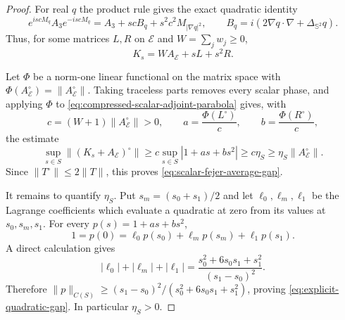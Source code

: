 \documentclass[11pt]{article}
\theoremstyle{remark}
\begin{document}
\begin{proof}
For real $q$ the product rule gives the exact quadratic identity
\begin{equation}
 e^{iscM_q}A_3e^{-iscM_q}
 =
 A_3+scB_q+s^2c^2M_{|\nabla q|^2},
 \qquad
 B_q=i\left(2\nabla q\cdot\nabla+\Delta_{\mathbb S^2}q\right).
 \label{eq:scalar-adjoint-parabola}
\end{equation}
Thus, for some matrices $L,R$ on $\mathcal E$ and
$W=\sum_jw_j\geq0$,
\begin{equation}
 K_s=WA_{\mathcal E}+sL+s^2R.
 \label{eq:compressed-scalar-adjoint-parabola}
\end{equation}

Let $\Phi$ be a norm-one linear functional on the matrix space with
$\Phi(A_{\mathcal E}^\circ)=\|A_{\mathcal E}^\circ\|$.  Taking traceless
parts removes every scalar phase, and applying $\Phi$ to
\eqref{eq:compressed-scalar-adjoint-parabola} gives, with
\[
 c=(W+1)\|A_{\mathcal E}^\circ\|>0,
 \qquad
 a=\frac{\Phi(L^\circ)}c,
 \qquad
 b=\frac{\Phi(R^\circ)}c,
\]
the estimate
\[
 \sup_{s\in S}
 \|(K_s+A_{\mathcal E})^\circ\|
 \geq
 c\sup_{s\in S}|1+as+bs^2|
 \geq
 c\eta_S
 \geq
 \eta_S\|A_{\mathcal E}^\circ\|.
\]
Since $\|T^\circ\|\leq2\|T\|$, this proves
\eqref{eq:scalar-fejer-average-gap}.

It remains to quantify $\eta_S$.  Put
$s_m=(s_0+s_1)/2$ and let $\ell_0,\ell_m,\ell_1$ be the Lagrange coefficients
which evaluate a quadratic at zero from its values at
$s_0,s_m,s_1$.  For every $p(s)=1+as+bs^2$,
\[
 1=p(0)=
 \ell_0p(s_0)+\ell_mp(s_m)+\ell_1p(s_1).
\]
A direct calculation gives
\[
 |\ell_0|+|\ell_m|+|\ell_1|
 =
 \frac{s_0^2+6s_0s_1+s_1^2}{(s_1-s_0)^2}.
\]
Therefore $\|p\|_{C(S)}\geq
(s_1-s_0)^2/(s_0^2+6s_0s_1+s_1^2)$, proving
\eqref{eq:explicit-quadratic-gap}.  In particular $\eta_S>0$.
\end{proof}
\end{document}
